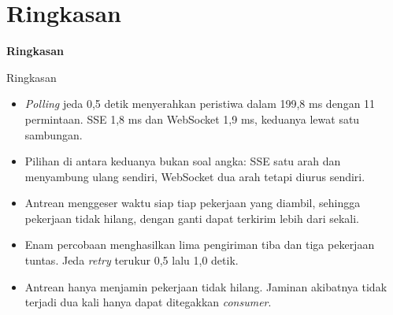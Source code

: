 \documentclass[aspectratio=169, table, 12pt]{beamer}
\begin{document}
\section{Ringkasan}

\begin{frame}{\hfill}
  \centering
  \Huge{\textbf{Ringkasan}}
\end{frame}

\begin{frame}{{\Large Ringkasan}}
  \vspace{8pt}
  \begin{itemize}
    \item \textit{Polling} jeda 0,5 detik menyerahkan peristiwa dalam 199,8
          ms dengan 11 permintaan. SSE 1,8 ms dan WebSocket 1,9 ms, keduanya
          lewat satu sambungan.
    \item Pilihan di antara keduanya bukan soal angka: SSE satu arah dan
          menyambung ulang sendiri, WebSocket dua arah tetapi diurus sendiri.
    \item Antrean menggeser waktu siap tiap pekerjaan yang diambil, sehingga
          pekerjaan tidak hilang, dengan ganti dapat terkirim lebih dari
          sekali.
    \item Enam percobaan menghasilkan lima pengiriman tiba dan tiga pekerjaan
          tuntas. Jeda \textit{retry} terukur 0,5 lalu 1,0 detik.
    \item Antrean hanya menjamin pekerjaan tidak hilang. Jaminan akibatnya
          tidak terjadi dua kali hanya dapat ditegakkan \textit{consumer}.
  \end{itemize}
\end{frame}
\end{document}
